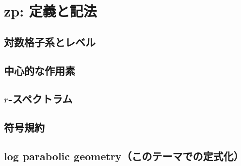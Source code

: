 
\section{zp: 定義と記法}

\subsection{対数格子系とレベル}

\subsection{中心的な作用素}

\subsection{$r$-スペクトラム}

\subsection{符号規約}

\subsection{log parabolic geometry（このテーマでの定式化）}
